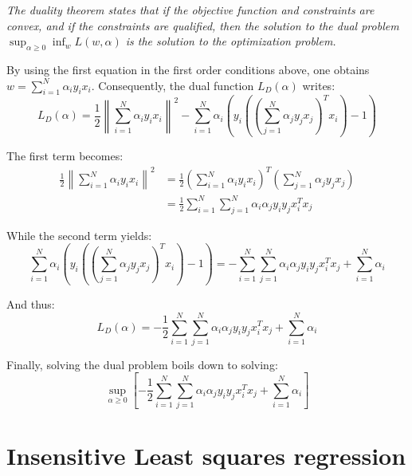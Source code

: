 \documentclass{article}
\begin{document}
{\it The duality theorem states that if the objective function and constraints are convex, and if the constraints are qualified, then the solution to the dual problem $\sup_{\alpha \geq 0} \inf_{w} L(w, \alpha)$ is the solution to the optimization problem.

By using the first equation in the first order conditions above, one obtains $w = \sum\limits_{i=1}^N \alpha_i y_i x_i$. Consequently, the dual function $L_D(\alpha)$ writes:
\begin{equation*}
L_D(\alpha) = \frac{1}{2} \left\| \sum\limits_{i=1}^N \alpha_i y_i x_i \right\|^2 - \sum\limits_{i=1}^N \alpha_i \left( y_i \left( \left(\sum\limits_{j=1}^N \alpha_j y_j x_j\right)^T x_i \right) -1 \right)
\end{equation*}

The first term becomes:
\begin{align*}
\frac{1}{2} \left\| \sum\limits_{i=1}^N \alpha_i y_i x_i \right\|^2 & = \frac{1}{2} \left( \sum\limits_{i=1}^N \alpha_i y_i x_i \right)^T \left( \sum\limits_{j=1}^N \alpha_j y_j x_j \right) \\
& =\frac{1}{2} \sum\limits_{i=1}^N \sum\limits_{j=1}^N \alpha_i \alpha_j y_i y_j x_i^T x_j
\end{align*}

While the second term yields:
\begin{equation*}
\sum\limits_{i=1}^N \alpha_i \left( y_i \left( \left(\sum\limits_{j=1}^N \alpha_j y_j x_j\right)^T x_i \right) -1 \right) = -\sum\limits_{i=1}^N \sum\limits_{j=1}^N \alpha_i \alpha_j y_i y_j x_i^T x_j + \sum\limits_{i=1}^N \alpha_i
\end{equation*}

And thus:
\begin{equation*}
L_D(\alpha) = -\frac{1}{2} \sum\limits_{i=1}^N \sum\limits_{j=1}^N \alpha_i \alpha_j y_i y_j x_i^T x_j + \sum\limits_{i=1}^N \alpha_i
\end{equation*}

Finally, solving the dual problem boils down to solving:
\begin{equation*}
\sup_{\alpha \geq 0} \left[-\frac{1}{2} \sum\limits_{i=1}^N \sum\limits_{j=1}^N \alpha_i \alpha_j y_i y_j x_i^T x_j + \sum\limits_{i=1}^N \alpha_i \right]
\end{equation*}
}

\section{Insensitive Least squares regression}
\end{document}
